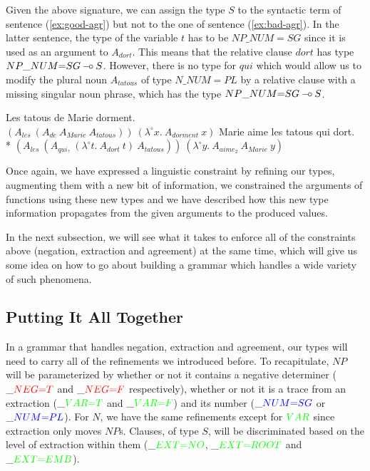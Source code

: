 Given the above signature, we can assign the type $S$ to the syntactic
term of sentence (\ref{ex:good-agr}) but not to the one of sentence
(\ref{ex:bad-agr}). In the latter sentence, the type of the variable $t$
has to be $NP\_NUM{=}SG$ since it is used as an argument to $A_{dort}$. This
means that the relative clause $dort$ has type $NP\_NUM{=}SG \mathbin{{-}\mkern-3.5mu{\circ}}
S$. However, there is no type for $qui$ which would allow us to modify
the plural noun $A_{tatous}$ of type $N\_NUM{=}PL$ by a relative clause with a
missing singular noun phrase, which has the type $NP\_NUM{=}SG \mathbin{{-}\mkern-3.5mu{\circ}} S$.

\begin{exe}
  \ex \label{ex:good-agr} Les tatous de Marie dorment. \\
      $(A_{les}\ (A_{de}\ A_{Marie}\ A_{tatous}))\ (\lambda^{\circ} x.\ A_{dorment}\ x)$
  \ex * \label{ex:bad-agr} Marie aime les tatous qui dort. \\
      * $(A_{les}\ (A_{qui_?}\ (\lambda^{\circ} t.\ A_{dort}\ t)\ A_{tatous}))\ (\lambda^{\circ} y.\ A_{aime_2}\ A_{Marie}\ y)$
\end{exe}

Once again, we have expressed a linguistic constraint by refining our
types, augmenting them with a new bit of information, we constrained the
arguments of functions using these new types and we have described how
this new type information propagates from the given arguments to the
produced values.

In the next subsection, we will see what it takes to enforce all of the
constraints above (negation, extraction and agreement) at the same time,
which will give us some idea on how to go about building a grammar which
handles a wide variety of such phenomena.


\subsection{Putting It All Together}

In a grammar that handles negation, extraction and agreement, our types
will need to carry all of the refinements we introduced before. To
recapitulate, $NP$ will be parameterized by whether or not it contains a
negative determiner ($\_\textcolor{red}{NEG{=}T}$ and
$\_\textcolor{red}{NEG{=}F}$ respectively), whether or not it is a trace
from an extraction ($\_\textcolor{green}{VAR{=}T}$ and
$\_\textcolor{green}{VAR{=}F}$) and its number
($\_\textcolor{blue}{NUM{=}SG}$ or $\_\textcolor{blue}{NUM{=}PL}$). For
$N$, we have the same refinements except for $\textcolor{green}{VAR}$
since extraction only moves $NP$s. Clauses, of type $S$, will be
discriminated based on the level of extraction within them
($\_\textcolor{green}{EXT{=}NO}$, $\_\textcolor{green}{EXT{=}ROOT}$ and
$\_\textcolor{green}{EXT{=}EMB}$).

